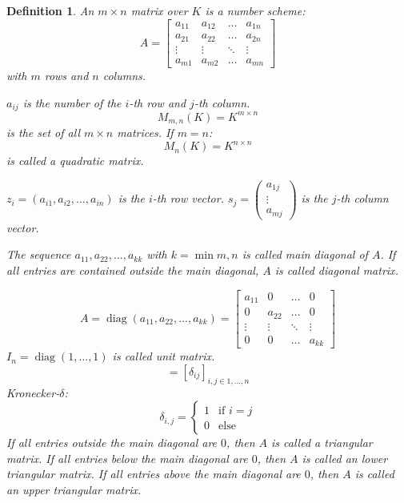 \documentclass[a4paper,landscape,twocolumn]{article}
\newtheorem{defi}{Definition}[section]
\begin{document}
\begin{defi}
  \label{definition-6-1}
  An $m \times n$ matrix over $K$ is a number scheme:
  \[
    A = \begin{bmatrix}
      a_{11} & a_{12} & \ldots & a_{1n} \\
      a_{21} & a_{22} & \ldots & a_{2n} \\
      \vdots & \vdots & \ddots & \vdots \\
      a_{m1} & a_{m2} & \ldots & a_{mn}
    \end{bmatrix}
  \]
  with $m$ rows and $n$ columns.

  $a_{ij}$ is the number of the $i$-th row and $j$-th column.
  \[ M_{m,n}(K) = K^{m\times n} \]
  is the set of all $m \times n$ matrices.
  If $m=n$:
  \[ M_n(K) = K^{n\times n} \]
  is called a \emph{quadratic matrix}.

  $z_i = (a_{i1}, a_{i2}, \dots, a_{in})$ is the $i$-th row vector.
  $s_j = \begin{pmatrix} a_{1j} \\ \vdots \\ a_{mj} \end{pmatrix}$ is the $j$-th column vector.

  The sequence $a_{11}, a_{22}, \dots, a_{kk}$ with $k = \min{m,n}$ is called main diagonal of $A$.
  If all entries are contained outside the main diagonal, $A$ is called \emph{diagonal matrix}.

  \[
    A = \operatorname{diag}(a_{11}, a_{22}, \dots, a_{kk})
      = \begin{bmatrix}
        a_{11} & 0 & \ldots & 0 \\
        0 & a_{22} & \ldots & 0 \\
        \vdots & \vdots & \ddots & \vdots \\
        0 & 0 & \ldots & a_{kk}
      \end{bmatrix}
  \]
  $I_n = \operatorname{diag}(1, \dots, 1)$ is called \emph{unit matrix}.
  \[ = [\delta_{ij}]_{i,j \in 1,\dots,n} \]
  Kronecker-$\delta$:
  \[
    \delta_{i,j} = \begin{cases}
      1 & \text{if } i = j \\
      0 & \text{else}
    \end{cases}
  \]
  If all entries outside the main diagonal are $0$, then $A$ is called a \emph{triangular matrix}.
  If all entries below the main diagonal are $0$, then $A$ is called an \emph{lower triangular matrix}.
  If all entries above the main diagonal are $0$, then $A$ is called an \emph{upper triangular matrix}.


\end{defi}
\end{document}

